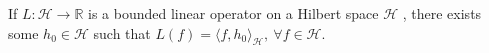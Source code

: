 

\begin{theorem}
     If $L : \mathcal{H} \rightarrow \mathbb{R}$ is a bounded linear operator on a Hilbert space $\mathcal{H}$ , there exists some $h_0 \in \mathcal{H}$ such that $L(f) = \langle f,h_0\rangle_\mathcal{H}, \ \forall f \in \mathcal{H}$.
\end{theorem}

